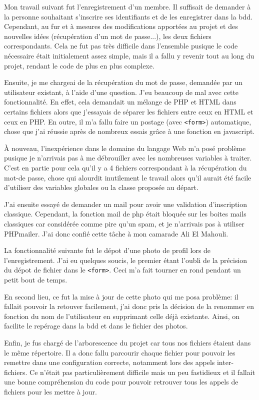 \documentclass{article}
\begin{document}
Mon travail suivant fut l'enregistrement d'un membre. Il suffisait de demander à la personne souhaitant s'inscrire ses identifiants et de les enregistrer dans la bdd. Cependant, au fur et à mesures des modifications apportées au projet et des nouvelles idées (récupération d'un mot de passe...), les deux fichiers correspondants. Cela ne fut pas très difficile dans l'ensemble pusique le code nécessaire était initialement assez simple, mais il a fallu y revenir tout au long du projet, rendant le code de plus en plus complexe.

Ensuite, je me chargeai de la récupération du mot de passe, demandée par un utilisateur existant, à l'aide d'une question. J'eu beaucoup de mal avec cette fonctionnalité. En effet, cela demandait un mélange de PHP et HTML dans certains fichiers alors que j'essayais de séparer les fichiers entre ceux en HTML et ceux en PHP. En outre, il m'a fallu faire un postage (avec \texttt{<form>}) automatique, chose que j'ai réussie après de nombreux essais grâce à une fonction en javascript.

À nouveau, l'inexpérience dans le domaine du langage Web m'a posé problème pusique je n'arrivais pas à me débrouiller avec les nombreuses variables à traiter. C'est en partie pour cela qu'il y a 4 fichiers correspondant à la récupération du mot-de passe, chose qui alourdit inutilement le travail alors qu'il aurait été facile d'utiliser des variables globales ou la classe proposée au départ.

J'ai ensuite essayé de demander un mail pour avoir une validation d'inscription classique. Cependant, la fonction mail de php était bloquée sur les boites mails classiques car considérée comme pire qu'un spam, et je n'arrivais pas à utiliser PHPmailer. J'ai donc confié cette tâche à mon camarade Ali El Mahouli.

La fonctionnalité suivante fut le dépot d'une photo de profil lors de l'enregistrement. J'ai eu quelques soucis, le premier étant l'oubli de la précision du dépot de fichier dans le \texttt{<form>}. Ceci m'a fait tourner en rond pendant un petit bout de temps.

En second lieu, ce fut la mise à jour de cette photo qui me posa problème: il fallait pouvoir la retouver facilement, j'ai donc pris la décision de la renommer en fonction du nom de l'utilisateur en supprimant celle déjà existante. Ainsi, on facilite le repérage dans la bdd et dans le fichier des photos.

Enfin, je fus chargé de l'arborescence du projet car tous nos fichiers étaient dans le même répertoire. Il a donc fallu parcourir chaque fichier pour pouvoir les remettre dans une configuration correcte, notamment lors des appels inter-fichiers. Ce n'était pas particulièrement difficile mais un peu fastidieux et il fallait une bonne compréhension du code pour pouvoir retrouver tous les appels de fichiers pour les mettre à jour.
\end{document}

